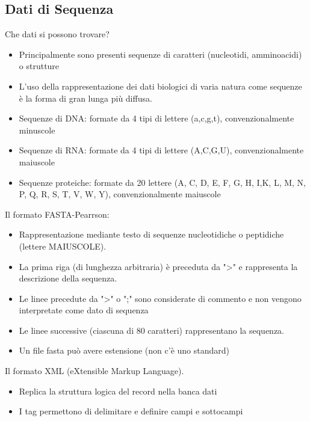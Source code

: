 \documentclass{article}
\begin{document}
\subsection{Dati di Sequenza}
Che dati si possono trovare?
\begin{itemize}
    \item Principalmente sono presenti
        \subitem{-} sequenze di caratteri (nucleotidi, amminoacidi)
        \subitem{-} o strutture
    \item L'uso della rappresentazione dei dati biologici di
    varia natura come sequenze è la forma di gran lunga
    più diffusa.
    \item Sequenze di DNA: formate da 4 tipi di lettere (a,c,g,t), convenzionalmente minuscole
    \item Sequenze di RNA: formate da 4 tipi di lettere (A,C,G,U), convenzionalmente maiuscole
    \item Sequenze proteiche: formate da 20 lettere (A, C, D, E, F, G, H, I,K, L, M, N, P, Q, R, S, T, V, W, Y), convenzionalmente maiuscole
\end{itemize}
Il formato FASTA-Pearrson: 
\begin{itemize}
    \item Rappresentazione mediante testo di sequenze nucleotidiche o
    peptidiche (lettere MAIUSCOLE).
    \item La prima riga (di lunghezza arbitraria) è preceduta da ">" e rappresenta
    la descrizione della sequenza.
    \item Le linee precedute da ">" o ";" sono considerate di commento e non
    vengono interpretate come dato di sequenza
    \item Le linee successive (ciascuna di 80 caratteri) rappresentano la
    sequenza.
    \item Un file fasta può avere estensione (non c'è uno standard)
\end{itemize}
Il formato XML (eXtensible Markup Language).
\begin{itemize}
    \item Replica la struttura logica del record nella banca dati
    \item I tag permettono di delimitare e definire campi e sottocampi
\end{itemize}
\end{document}

